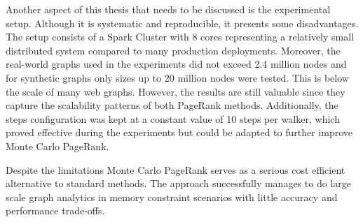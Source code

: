 Another aspect of this thesis that needs to be discussed is the experimental setup. Although it is systematic and reproducible, it presents some disadvantages. The setup consists of a Spark Cluster with 8 cores representing a relatively small distributed system compared to many production deployments. Moreover, the real-world graphs used in the experiments did not exceed 2.4 million nodes and for synthetic graphs only sizes up to 20 million nodes were tested. This is below the scale of many web graphs. However, the results are still valuable since they capture the scalability patterns of both PageRank methods. Additionally, the steps configuration was kept at a constant value of 10 steps per walker, which proved effective during the experiments but could be adapted to further improve Monte Carlo PageRank.\par

Despite the limitations Monte Carlo PageRank serves as a serious cost efficient alternative to standard methods. The approach successfully manages to do large scale graph analytics in memory constraint scenarios with little accuracy and performance trade-offs.



